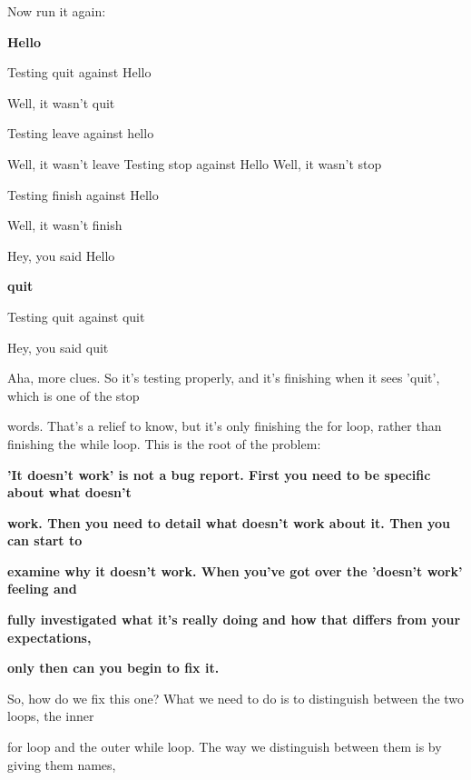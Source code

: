 \documentclass[a4paper,11pt]{book}
\begin{document}
\noindent Now run it again:

\noindent 

\noindent \textbf{Hello}

\noindent Testing quit against Hello

\noindent Well, it wasn't quit

\noindent Testing leave against hello

\noindent Well, it wasn't leave Testing stop against Hello Well, it wasn't stop

\noindent Testing finish against Hello

\noindent Well, it wasn't finish

\noindent Hey, you said Hello

\noindent \textbf{quit}

\noindent Testing quit against quit

\noindent Hey, you said quit

\noindent 

\noindent 

\noindent Aha, more clues. So it's testing properly, and it's finishing when it sees 'quit', which is one of the stop

\noindent words. That's a relief to know, but it's only finishing the for loop, rather than finishing the while loop. This is the root of the problem:

\noindent 

\noindent 

\noindent \textbf{'It doesn't work' is not a bug report. First you need to be specific about what doesn't}

\noindent \textbf{work. Then you need to detail what doesn't work about it. Then you can start to}

\noindent \textbf{examine why it doesn't work. When you've got over the 'doesn't work' feeling and}

\noindent \textbf{fully investigated what it's really doing and how that differs from your expectations,}

\noindent \textbf{only then can you begin to fix it.}

\noindent 

\noindent 

\noindent So,  how  do  we fix  this one?  What  we need  to  do  is  to  distinguish  between  the two  loops,  the  inner

\noindent for loop and the outer while loop.  The  way  we  distinguish  between  them  is  by  giving  them names,
\end{document}
